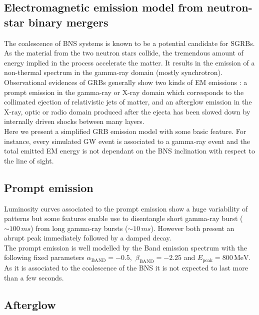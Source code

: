 \documentclass[a0,portrait]{a0poster}
\newcommand{\ECM}[1] {\textbf{\textcolor{magenta}{#1}}}
\begin{document}
\begin{multicols}{2}
\section*{Electromagnetic emission model from neutron-star binary mergers}


The coalescence of BNS systems is known to be a potential candidate for SGRBs. As the material from the two neutron stars collide, the tremendous amount of energy implied in the process accelerate the matter. It results in the emission of a non-thermal spectrum in the gamma-ray domain (mostly synchrotron). \\
Observational evidences of GRBs generally show two kinds of EM emissions : a prompt emission in the gamma-ray or X-ray domain which corresponds to the collimated ejection of relativistic jets of matter, and an afterglow emission in the X-ray, optic or radio domain produced after the ejecta has been slowed down by internally driven shocks between many layers. \\
Here we present a simplified GRB emission model with some basic feature. For instance, every simulated GW event is associated to a gamma-ray event and the total emitted EM energy is not dependant on the BNS inclination with respect to the line of sight.

\subsection*{Prompt emission}


Luminosity curves associated to the prompt emission show a huge variability of patterns but some features enable use to disentangle short gamma-ray burst ($\sim 100 \, ms$) from long gamma-ray bursts ($\sim 10 \, ms$). However both present an abrupt peak immediately followed by a damped decay. \\
\indent The prompt emission is well modelled by the Band emission spectrum with the following fixed parameters $\alpha_{\mathrm{BAND}} = - 0.5$, $\, \beta_{\mathrm{BAND}} = - 2.25$ and $E_{\mathrm{peak}} = 800 \, \mathrm{MeV}$. As it is associated to the coalescence of the BNS it is not expected to last more than a few seconds. 

\subsection*{Afterglow}


\end{multicols}
\end{document}
